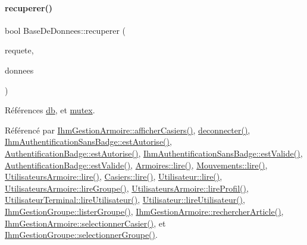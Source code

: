 \mbox{\label{class_base_de_donnees_a77539baad389f5acf754cd2cd452403e}} 
\paragraph{\texorpdfstring{recuperer()}{recuperer()}\hspace{0.1cm}{\footnotesize\ttfamily [1/8]}}
{\footnotesize\ttfamily bool Base\+De\+Donnees\+::recuperer (\begin{DoxyParamCaption}\item[{Q\+String}]{requete,  }\item[{Q\+String \&}]{donnees }\end{DoxyParamCaption})}



Références \hyperlink{class_base_de_donnees_a3e738dcf443370c46a541677ab619f06}{db}, et \hyperlink{class_base_de_donnees_aa1b4696fac87a740f914aa73739086f2}{mutex}.



Référencé par \hyperlink{class_ihm_gestion_armoire_a04201173bd9ac135227ac56a6c22a999}{Ihm\+Gestion\+Armoire\+::afficher\+Casiers()}, \hyperlink{class_base_de_donnees_ae780999d25a26a0e4dbe0706a4785978}{deconnecter()}, \hyperlink{class_ihm_authentification_sans_badge_a17b178accdfe141a7e27fa1888bebcbc}{Ihm\+Authentification\+Sans\+Badge\+::est\+Autorise()}, \hyperlink{class_authentification_badge_aceb9c5a09dddbff73cd02973913c79c1}{Authentification\+Badge\+::est\+Autorise()}, \hyperlink{class_ihm_authentification_sans_badge_a676cfdbf93ef79fb7c4c47fdd8d0fb43}{Ihm\+Authentification\+Sans\+Badge\+::est\+Valide()}, \hyperlink{class_authentification_badge_af320bf9cdbb285c48cd323e0ec3ef529}{Authentification\+Badge\+::est\+Valide()}, \hyperlink{class_armoires_a2b64b3df08cf848d06b4ffb6a49ae858}{Armoires\+::lire()}, \hyperlink{class_mouvements_a1d8306c0672efe509e71d2bdbd60208b}{Mouvements\+::lire()}, \hyperlink{class_utilisateurs_armoire_a10b2038874606c0afccf0f18c038dd0c}{Utilisateurs\+Armoire\+::lire()}, \hyperlink{class_casiers_a7b1d58f40217ef13a5dd0d966df38c9a}{Casiers\+::lire()}, \hyperlink{class_utilisateur_aa7d1a92ff4e06e9d302369f6c48884e1}{Utilisateur\+::lire()}, \hyperlink{class_utilisateurs_armoire_aeadd41da356116c6e393d832e2b819e9}{Utilisateurs\+Armoire\+::lire\+Groupe()}, \hyperlink{class_utilisateurs_armoire_a952931c38642273c5e959edb69706144}{Utilisateurs\+Armoire\+::lire\+Profil()}, \hyperlink{class_utilisateur_terminal_a196420ecc14bc0645e3e1c66d796b8e6}{Utilisateur\+Terminal\+::lire\+Utilisateur()}, \hyperlink{class_utilisateur_a5911f84daf6d47d7f50e6d16022b292e}{Utilisateur\+::lire\+Utilisateur()}, \hyperlink{class_ihm_gestion_groupe_a7afabe81c405b35e7cfd4e760eda8c84}{Ihm\+Gestion\+Groupe\+::lister\+Groupe()}, \hyperlink{class_ihm_gestion_armoire_a594f25b58b70700e19e3e7f567325c40}{Ihm\+Gestion\+Armoire\+::rechercher\+Article()}, \hyperlink{class_ihm_gestion_armoire_ac2e2365408fcbf66c0e75bb828b40162}{Ihm\+Gestion\+Armoire\+::selectionner\+Casier()}, et \hyperlink{class_ihm_gestion_groupe_a322f2c8584ae8e5be7f2075b73905beb}{Ihm\+Gestion\+Groupe\+::selectionner\+Groupe()}.


